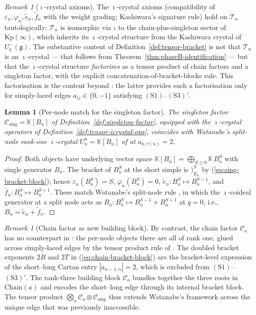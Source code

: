 \documentclass[11pt]{article}
\newtheorem{lemma}[theorem]{Lemma}
\theoremstyle{definition}
\theoremstyle{remark}
\newtheorem{remark}[theorem]{Remark}
\newcommand{\Kp}{\mathrm{Kp}}
\newcommand{\Chain}{\mathrm{Chain}}
\newcommand{\KK}{\mathbb{K}}
\newcommand{\g}{\mathfrak{g}}
\newcommand{\Uqm}{U_q^-(\g)}
\newcommand{\Cmid}{\mathcal{C}}
\newcommand{\Csing}{\mathcal{C}_{\mathrm{sing}}}
\newcommand{\TT}{\mathcal{T}}
\newcommand{\labr}[1]{{)}_{#1}}
\begin{document}
\begin{remark}[$\imath$-crystal axioms]\label{rmk:icrystal-axioms}
The $\imath$-crystal axioms (compatibility of $\varepsilon_n, \varphi_n,
\tilde e_n, \tilde f_n$ with the weight grading; Kashiwara's signature rule)
hold on $\TT_n$ tautologically: $\TT_n$ is isomorphic via $\iota$ to the
chain-plus-singleton sector of $\Kp(\infty)$, which inherits its $\imath$-crystal
structure from the Kashiwara crystal of $\Uqm$. The substantive content of
Definition~\ref{def:tensor-bracket} is not that $\TT_n$ is an $\imath$-crystal
--- that follows from Theorem~\ref{thm:phaseB-identification} --- but that the
$\imath$-crystal structure \emph{factorises} as a tensor product of chain factors
and a singleton factor, with the explicit concatenation-of-bracket-blocks rule.
This factorisation is the content beyond \cite[Prop.~5.1.1]{Watanabe2110}: the
latter provides such a factorisation only for simply-laced edges
$a_{ij} \in \{0, -1\}$ satisfying $(\mathrm{S1})$--$(\mathrm{S3})'$.
\end{remark}

\begin{lemma}[Per-node match for the singleton factor]\label{lem:singleton-watanabe-match}
The singleton factor $\Csing = \KK[B_n]$ of Definition~\ref{def:singleton-factor},
equipped with the $\imath$-crystal operators of
Definition~\ref{def:tensor-icrystal-ops}, coincides with Watanabe's split-node
rank-one $\imath$-crystal $U^n_n = \KK[B_n]$ of \cite[\S4.1]{Watanabe2110} at
$a_{n,\tau(n)} = 2$.
\end{lemma}

\begin{proof}
Both objects have underlying vector space $\KK[B_n] = \bigoplus_{S \geq 0} \KK\,B_n^S$
with single generator $B_n$. The bracket of $B_n^S$ at the short simple is
$\labr{E_n}^S$ by (\ref{eq:sing-bracket-block}); hence $\varepsilon_n(B_n^S) = S$,
$\varphi_n(B_n^S) = 0$, $\tilde e_n: B_n^S \mapsto B_n^{S-1}$, and
$\tilde f_n: B_n^S \mapsto B_n^{S+1}$. These match Watanabe's split-node rule
\cite[\S4.1, Case~$a_{i,\tau(i)} = 2$]{Watanabe2110}, in which the $\imath$-coideal
generator at a split node acts as $B_n: B_n^S \mapsto B_n^{S-1} + B_n^{S+1}$ at
$q = 0$, i.e., $B_n = \tilde e_n + \tilde f_n$.
\end{proof}

\begin{remark}[Chain factor as new building block]\label{rmk:chain-factor-new}
By contrast, the chain factor $\Cmid_a$ has no counterpart in
\cite[\S4.1]{Watanabe2110}: the per-node objects there are all of rank one, glued
across simply-laced edges by the tensor product rule of \cite[Prop.~5.1.1]{Watanabe2110}.
The doubled bracket exponents $2B$ and $2T$ in (\ref{eq:chain-bracket-block}) are
the bracket-level expression of the short--long Cartan entry $|a_{n-1, n}| = 2$,
which is excluded from $(\mathrm{S1})$--$(\mathrm{S3})'$. The rank-three building
block $\Cmid_a$ bundles together the three roots in $\Chain(a)$ and encodes the
short--long edge through its internal bracket block. The tensor product
$\bigotimes_a \Cmid_a \otimes \Csing$ thus extends Watanabe's framework across
the unique edge that was previously inaccessible.
\end{remark}
\end{document}

